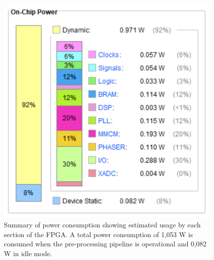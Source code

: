 \documentclass[12pt]{report}
\begin{document}
\begin{figure}[h]
    \centering
    \includegraphics[scale=0.9]{figures/power_report.PNG}
    \caption{Summary of power consumption showing estimated usage by each section of the FPGA. A total power consumption of 1,053 W is consumed when the pre-processing pipeline is operational and 0,082 W in idle mode.}
    \label{fig:fpga_power}
\end{figure}




\end{document}

